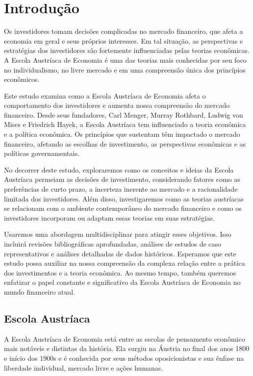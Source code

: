 \documentclass[a4paper,12pt]{article}
\begin{document}

\newpage
\tableofcontents


\section{Introdução}
\hspace{0.5cm}Os investidores tomam decisões complicadas no mercado financeiro, que afeta a economia 
em geral e seus próprios interesses. Em tal situação, as perspectivas e estratégias dos 
investidores são fortemente influenciadas pelas teorias econômicas. A Escola Austríaca de 
Economia é uma das teorias mais conhecidas por seu foco no individualismo, no livre mercado 
e em uma compreensão única dos princípios econômicos.

Este estudo examina como a Escola Austríaca de Economia afeta o comportamento dos 
investidores e aumenta nossa compreensão do mercado financeiro. Desde seus fundadores, Carl Menger, 
Murray Rothbard, Ludwig von Mises e Friedrich Hayek, a Escola Austríaca tem influenciado a teoria econômica 
e a política econômica. Os princípios que sustentam têm impactado o mercado financeiro, 
afetando as escolhas de investimento, as perspectivas econômicas e as políticas governamentais.

No decorrer deste estudo, exploraremos como os conceitos e ideias da Escola Austríaca 
permeiam as decisões de investimento, considerando fatores como as preferências de curto prazo, 
a incerteza inerente ao mercado e a racionalidade limitada dos investidores. Além disso, 
investigaremos como as teorias austríacas se relacionam com o ambiente contemporâneo do 
mercado financeiro e como os investidores incorporam ou adaptam essas teorias em suas estratégias.

Usaremos uma abordagem multidisciplinar para atingir esses objetivos. Isso incluir\'a revisões 
bibliográficas aprofundadas, análises de estudos de caso representativos e análises detalhadas 
de dados históricos. Esperamos que este estudo possa auxiliar na nossa compreensão da complexa relação 
entre a prática dos investimentos e a teoria econômica. Ao mesmo tempo, também queremos enfatizar 
o papel constante e significativo da Escola Austríaca de Economia no mundo financeiro atual.

\subsection{Escola Austríaca}
\hspace{0.5cm}A Escola Austríaca de Economia está entre as escolas de pensamento econômico mais notáveis e
distintas da história. Ela surgiu na Áustria no final dos anos 1800 e início dos 1900s e é 
conhecida por seus métodos oposicionistas e sua ênfase na liberdade individual, mercado livre 
e ações humanas.
\end{document}
